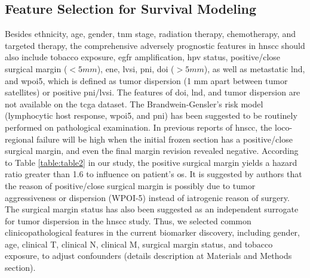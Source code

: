\documentclass[jpm,article,submit,moreauthors,pdftex]{Definitions/mdpi}
\newenvironment{MyColorPar}[1]{%
    \leavevmode\color{#1}\ignorespaces%
}{%
}%
\begin{document}
\begin{paracol}{2}
\subsection{Feature Selection for Survival Modeling} %
Besides ethnicity, age, gender, \acrshort{tnm} stage, radiation therapy, chemotherapy, and targeted therapy, the comprehensive adversely prognostic features in \acrshort{hnscc} should also include tobacco exposure, \acrshort{egfr} amplification, \acrfull{hpv} status, positive/close surgical margin ($<5 mm$), \acrfull{ene}, \acrfull{lvsi}, \acrfull{pni}, \acrfull{doi} ($>5 mm$), as well as metastatic \acrfull{lnd}\cite{Cheraghlou2018}, and \acrfull{wpoi5}, which is defined as tumor dispersion (1 mm apart between tumor satellites) or positive \acrshort{pni}/\acrshort{lvsi}\cite{Amin2017}.
The features of \acrshort{doi}, \acrshort{lnd}, and tumor dispersion are not available on the \acrshort{tcga} dataset. The Brandwein-Gensler's risk model (lymphocytic host response, \acrshort{wpoi5}, and \acrshort{pni})\cite{Brandwein-Gensler2010}\cite{Sinha2018} has been suggested to be routinely performed on pathological examination. In previous reports of \acrshort{hnscc}, the loco-regional failure will be high when the initial frozen section has a positive/close surgical margin, and even the final margin revision revealed negative\cite{Bulbul2019b}.
According to Table \ref{table:table2} %
in our study, the positive surgical margin yields a hazard ratio greater than 1.6 to influence on patient's \acrshort{os}.
It is suggested by authors \cite{Scholl1986}\cite{Sutton2003}\cite{Shaw2004}\cite{Guillemaud2010a}\cite{Patel2010}\cite{Kuriakose2017}\cite{Shapiro2017}\cite{Saidak2018}\cite{Miguelanez-Medran2019}\cite{Saidak2019} that the reason of positive/close surgical margin is possibly due to tumor aggressiveness or dispersion (WPOI-5) instead of iatrogenic reason of surgery. The surgical margin status has also been suggested as an independent surrogate for tumor dispersion in the \acrshort{hnscc} study. Thus, we selected common clinicopathological features in the current biomarker discovery, including gender, age, clinical T, clinical N, clinical M, surgical margin status, and tobacco exposure, to adjust confounders (details description at Materials and Methods section).


\begin{MyColorPar}{red}



\end{MyColorPar}
\end{paracol}
\end{document}
